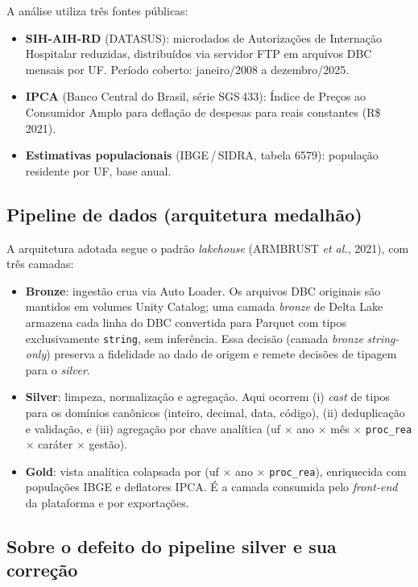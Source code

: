 \documentclass[12pt,a4paper,oneside]{article}
\newcommand{\rs}{R\$\,}
\begin{document}
A análise utiliza três fontes públicas:
\begin{itemize}
\item \textbf{SIH-AIH-RD} (DATASUS): microdados de Autorizações de
Internação Hospitalar reduzidas, distribuídos via servidor FTP em
arquivos DBC mensais por UF. Período coberto: janeiro/2008 a
dezembro/2025.
\item \textbf{IPCA} (Banco Central do Brasil, série SGS\,433):
Índice de Preços ao Consumidor Amplo para deflação de despesas
para reais constantes (\rs 2021).
\item \textbf{Estimativas populacionais} (IBGE\,/\,SIDRA, tabela
6579): população residente por UF, base anual.
\end{itemize}

\subsection{Pipeline de dados (arquitetura medalhão)}

A arquitetura adotada segue o padrão \textit{lakehouse}
(ARMBRUST \textit{et al.}, 2021), com três camadas:

\begin{itemize}
\item \textbf{Bronze}: ingestão crua via Auto Loader. Os arquivos
DBC originais são mantidos em volumes Unity Catalog; uma camada
\textit{bronze} de Delta Lake armazena cada linha do DBC convertida
para Parquet com tipos exclusivamente \texttt{string}, sem
inferência. Essa decisão (camada \textit{bronze} \textit{string-only})
preserva a fidelidade ao dado de origem e remete decisões de
tipagem para o \textit{silver}.

\item \textbf{Silver}: limpeza, normalização e agregação. Aqui
ocorrem (i) \textit{cast} de tipos para os domínios canônicos
(inteiro, decimal, data, código), (ii) deduplicação e validação,
e (iii) agregação por chave analítica
(uf $\times$ ano $\times$ mês $\times$ \texttt{proc\_rea}
$\times$ caráter $\times$ gestão).

\item \textbf{Gold}: vista analítica colapsada por
(uf $\times$ ano $\times$ \texttt{proc\_rea}), enriquecida com
populações IBGE e deflatores IPCA. É a camada consumida pelo
\textit{front-end} da plataforma e por exportações.
\end{itemize}

\subsection{Sobre o defeito do pipeline silver e sua correção}\label{sub:bug}
\end{document}
